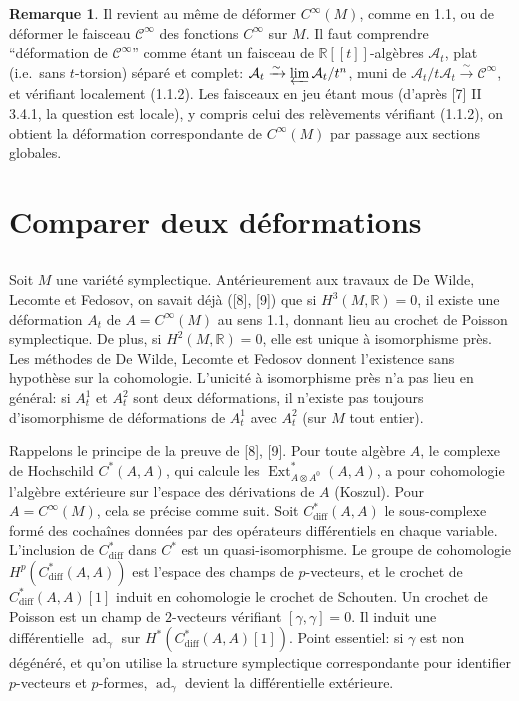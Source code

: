 \documentclass[11pt,a4paper]{article}
\theoremstyle{plain}
\theoremstyle{definition}
\newtheorem{remark}[theorem]{Remarque}
\DeclareMathOperator{\Ext}{Ext}
\DeclareMathOperator{\ad}{ad}
\newcommand{\R}{\mathbb{R}}
\newcommand{\iso}{\xrightarrow{\sim}}
\begin{document}
\begin{remark}
Il revient au m\^eme de d\'eformer $C^{\infty}(M)$, comme en 1.1, ou de
d\'eformer le faisceau $\mathcal{C}^{\infty}$ des fonctions $C^{\infty}$ sur $M$. Il faut comprendre ``d\'eformation
de $\mathcal{C}^{\infty}$'' comme \'etant un faisceau de $\R[[t]]$-alg\`ebres $\mathcal{A}_{t}$, plat (i.e.\ sans $t$-torsion)
s\'epar\'e et complet: $\mathcal{A}_{t} \iso \varprojlim \mathcal{A}_{t}/t^{n}$, muni de $\mathcal{A}_{t}/t\mathcal{A}_{t} \iso \mathcal{C}^{\infty}$, et v\'erifiant
localement (1.1.2). Les faisceaux en jeu \'etant mous (d'apr\`es [7] II 3.4.1, la question
est locale), y compris celui des rel\`evements v\'erifiant (1.1.2), on obtient la
d\'eformation correspondante de $C^{\infty}(M)$ par passage aux sections globales.
\end{remark}

\section{Comparer deux d\'eformations}

\subsection{}
Soit $M$ une vari\'et\'e symplectique. Ant\'erieurement aux travaux de De Wilde,
Lecomte et Fedosov, on savait d\'ej\`a ([8], [9]) que si $H^{3}(M,\R) = 0$, il existe une
d\'eformation $A_{t}$ de $A = C^{\infty}(M)$ au sens 1.1, donnant lieu au crochet de Poisson symplectique. De plus, si $H^{2}(M, \R) = 0$, elle est unique \`a isomorphisme pr\`es. Les m\'ethodes de De Wilde, Lecomte et Fedosov donnent l'existence sans hypoth\`ese sur la cohomologie. L'unicit\'e \`a isomorphisme pr\`es n'a pas lieu en g\'en\'eral: si $A_{t}^{1}$ et $A_{t}^{2}$ sont deux d\'eformations, il n'existe pas toujours d'isomorphisme de d\'eformations de $A_{t}^{1}$ avec $A_{t}^{2}$ (sur $M$ tout entier).

Rappelons le principe de la preuve de [8], [9]. Pour toute alg\`ebre $A$, le complexe de Hochschild $C^{*}(A,A)$, qui calcule les $\Ext^{*}_{A \otimes A^{0}}(A,A)$, a pour cohomologie l'alg\`ebre ext\'erieure sur l'espace des d\'erivations de $A$ (Koszul). Pour $A = C^{\infty}(M)$, cela se pr\'ecise comme suit. Soit $C^{*}_{\text{diff}}(A,A)$ le sous-complexe form\'e des cocha\^ines donn\'ees par des op\'erateurs diff\'erentiels en chaque variable. L'inclusion de $C^{*}_{\text{diff}}$ dans $C^{*}$ est un quasi-isomorphisme. Le groupe de cohomologie $H^{p}(C^{*}_{\text{diff}}(A,A))$ est l'espace des champs de $p$-vecteurs, et le crochet de $C^{*}_{\text{diff}}(A,A)[1]$ induit en cohomologie le crochet de Schouten. Un crochet de Poisson est un champ de $2$-vecteurs v\'erifiant $[\gamma,\gamma] = 0$. Il induit une diff\'erentielle $\ad_{\gamma}$ sur $H^{*}(C^{*}_{\text{diff}}(A,A)[1])$. Point essentiel: si $\gamma$ est non d\'eg\'en\'er\'e, et qu'on utilise la structure symplectique correspondante pour identifier $p$-vecteurs et $p$-formes, $\ad_{\gamma}$ devient la diff\'erentielle ext\'erieure.
\end{document}
